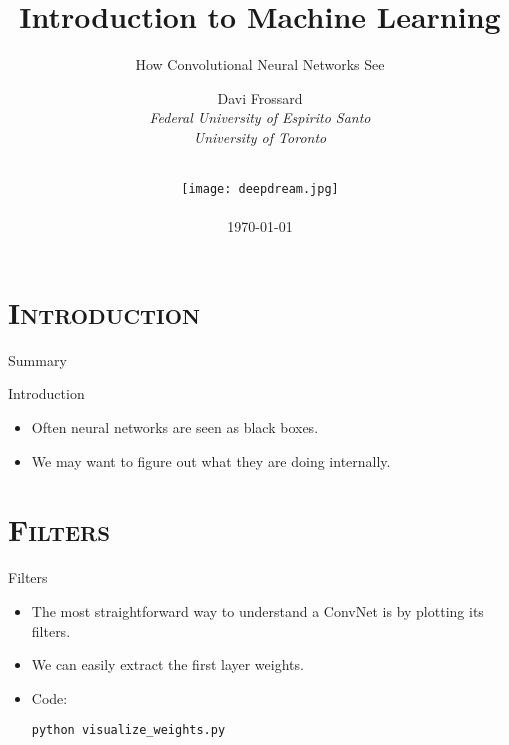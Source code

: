 


\section{\scshape Introduction}
\begin{frame}
	\title{Introduction to Machine Learning}
	\subtitle{How Convolutional Neural Networks See}
	\author{
		Davi Frossard\\
		{\it Federal University of Espirito Santo \\ University of Toronto}\\
	}
	\date{
		\vspace{-2em}\\
		\texttt{[image: deepdream.jpg]}\\[-1ex]
		\\
		\today
	}
	\titlepage
\end{frame}

\begin{frame}{Summary}
	\tableofcontents
\end{frame}

\begin{frame}{Introduction}
	\begin{itemize}
		\item Often neural networks are seen as black boxes.
		\item We may want to figure out what they are doing internally.
	\end{itemize}
\end{frame}

\section{\scshape Filters}
\begin{frame}{Filters}
	\begin{itemize}
		\item The most straightforward way to understand a ConvNet is by plotting its filters.
		\item We can easily extract the first layer weights.
		\item<2-> Code:
		\begin{center}
			{\smaller \texttt{python visualize\_weights.py}}
		\end{center}
	\end{itemize}
\end{frame}

